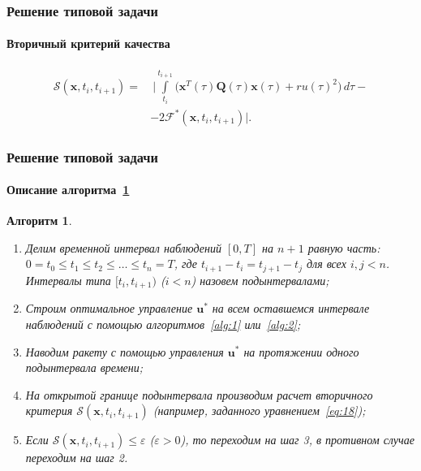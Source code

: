 \documentclass[ignorenonframetext,hyperref={pdftex,unicode},compress]{beamer}
\newtheorem{alg}{Алгоритм}
\begin{document}
\begin{frame}
	\frametitle{Решение типовой задачи}
	\framesubtitle{Вторичный критерий качества}
    
    \begin{equation}\label{eq:18}
        \begin{split}
            \mathscr{S}(\mathbf{x}, t_i, t_{i+1}) =&~ \Biggl| \int\limits_{t_i}^{t_{i+1}} \bigl( \mathbf{x}^T(\tau)\mathbf{Q}(\tau)\mathbf{x}(\tau) + ru(\tau)^2 \bigr)\,d\tau -\\
            &- 2\mathcal{F}^*(\mathbf{x}, t_i, t_{i+1}) \Biggr| \text{.}
        \end{split}
    \end{equation}
\end{frame}



\begin{frame}
	\frametitle{Решение типовой задачи}
	\framesubtitle{Описание алгоритма~\ref{alg:3}}\small
    
    \begin{alg}\label{alg:3}~
        \begin{enumerate}
            \item
                Делим временной интервал наблюдений $[0, T]$ на $n+1$ равную часть: $0 = t_0 \leqslant t_1 \leqslant t_2 \leqslant \ldots \leqslant t_{n} = T$, где $t_{i+1}-t_i = t_{j+1}-t_j$ для всех $i, j < n$. Интервалы типа $[t_i, t_{i+1})$ ($i<n$) назовем \emph{подынтервалами};

            \item
                Строим оптимальное управление $\mathbf{u}^*$ на всем оставшемся интервале наблюдений с помощью алгоритмов~\ref{alg:1} или~\ref{alg:2};

            \item
                Наводим ракету с помощью управления $\mathbf{u}^*$ на протяжении одного подынтервала времени;

            \item
                На открытой границе подынтервала производим расчет вторичного критерия $\mathscr{S}(\mathbf{x}, t_i, t_{i+1})$ (например, заданного уравнением~\ref{eq:18});

            \item
                Если $\mathscr{S}(\mathbf{x}, t_i, t_{i+1}) \leqslant \varepsilon$ ($\varepsilon > 0$), то переходим на шаг 3, в противном случае переходим на шаг 2.
        \end{enumerate}
    \end{alg}
\end{frame}
\end{document}
